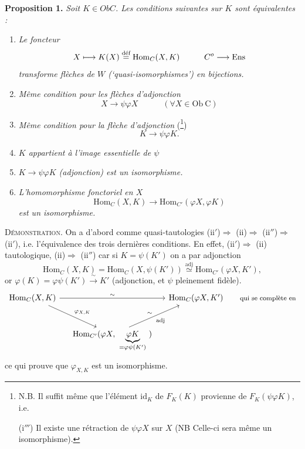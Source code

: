 \textbf{Proposition 1.} \textit{Soit $K\in \mathit{Ob}C$. Les conditions suivantes sur $K$ sont équivalentes :}


\begin{enumerate}
\item[(i)] \textit{Le foncteur}
\[
X\longmapsto K(X)\dfeq\mathrm{Hom}_C(X,K) \qquad\quad C^{o}\longrightarrow\mathrm{Ens}
\]
\textit{transforme flèches de $W$ (‘quasi-isomorphismes’) en bijections.}
\item[(i$'$)] \textit{Même condition pour les flèches d'adjonction}
\[
X\longrightarrow\psi\varphi X \qquad\quad (\forall X\in\mathrm{Ob}\ \mathrm{C})
\]
\item[(i$''$)] \textit{Même condition pour la flèche d'adjonction} (\footnote[6]{N.B. Il suffit même que l'élément $\mathrm{id}_K$ de $F_K(K)$ provienne de $F_K(\psi\varphi K)$, i.e.\par (i$'''$) Il existe une rétraction de $\psi\varphi X$ sur $X$ (NB Celle-ci sera même un isomorphisme).})
\[
K\longrightarrow\psi\varphi K.
\]
\item[(ii)] \textit{$K$ appartient à l'image essentielle de $\psi$}
\item[(ii$'$)] \textit{$K\longrightarrow\psi\varphi K$ (adjonction) est un isomorphisme.}
\item[(ii$''$)] \textit{L'homomorphisme fonctoriel en $X$}
\[
\mathrm{Hom}_C(X,K)\longrightarrow\mathrm{Hom}_{C'}(\varphi X,\varphi K)
\]
\textit{est un isomorphisme.}
\end{enumerate}

\textsc{Démonstration.} On a d'abord comme quasi-tautologies (ii$'$)$\Longrightarrow$ (ii)$\Longrightarrow$ (ii$''$)$\Longrightarrow$ (ii$'$), i.e. l'équivalence des trois dernières conditions. En effet, (ii$'$)$\Longrightarrow$ (ii) tautologique, (ii)$\Longrightarrow$ (ii$''$) car si $K=\psi(K')$ on a %
par adjonction
\[
\mathrm{Hom}_C(X,K)=\mathrm{Hom}_C(X,\psi(K'))\overset{\text{adj}}{\simeq}\mathrm{Hom}_{C'}(\varphi X,K'),
\]
or $\varphi(K)=\varphi\psi(K')\xrightarrow{\ \sim\ }K'$ (adjonction, et $\psi$ pleinement fidèle).
\[
\begin{tikzcd}[column sep=small, row sep=large]
\mathrm{Hom}_C(X,K) \arrow[rr, "\sim"] \arrow[dr, "\varphi_{X,K}"] & & \mathrm{Hom}_C(\varphi X,K') & \text{\footnotesize qui se complète en} \\ %
& \mathrm{Hom}_{C'}(\varphi X,\ \underbrace{\varphi K}_{=\varphi\psi(K')}\ ) \arrow[ur, "\sim", "\text{adj}"'] & &
\end{tikzcd}
\]
ce qui prouve que $\varphi_{X,K}$ est un isomorphisme.

